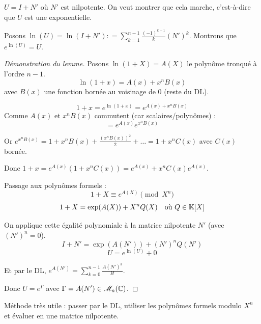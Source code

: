  $U = I + N'$ où $N'$ est nilpotente.
On veut montrer que cela marche, c'est-à-dire que $U$ est une exponentielle.

Posons $\ln(U) = \ln(I + N') \mathrel{\mathop:}= \sum_{k=1}^{n-1} \frac{(-1)^{k-1}}{k} (N')^k$.
Montrons que $e^{\ln(U)} = U$.

\begin{proof}[Démonstration du lemme]
    Posons $\ln(1+X) = A(X)$ le polynôme tronqué à l'ordre $n-1$.
    \[ \ln(1+x) = A(x) + x^n B(x) \]
    avec $B(x)$ une fonction bornée au voisinage de 0 (reste du DL).
    
    \[ 1+x = e^{\ln(1+x)} = e^{A(x) + x^n B(x)} \]
    Comme $A(x)$ et $x^n B(x)$ commutent (car scalaires/polynômes) :
    \[ = e^{A(x)} e^{x^n B(x)} \]
    
    Or $e^{x^n B(x)} = 1 + x^n B(x) + \frac{(x^n B(x))^2}{2} + \dots = 1 + x^n C(x)$ avec $C(x)$ bornée.
    
    Donc $1+x = e^{A(x)} (1 + x^n C(x)) = e^{A(x)} + x^n C(x) e^{A(x)}$.
    
    Passage aux polynômes formels :
    \[ 1+X \equiv e^{A(X)} \pmod{X^n} \]
    \[ 1+X = \exp(A(X)) + X^n Q(X) \quad \text{où } Q \in \mathbb{K}[X] \]
    
    On applique cette égalité polynomiale à la matrice nilpotente $N'$ (avec $(N')^n = 0$).
    \[ I + N' = \exp(A(N')) + (N')^n Q(N') \]
    \[ U = e^{\ln(U)} + 0 \]
    
    Et par le DL, $e^{A(N')} = \sum_{k=0}^{n-1} \frac{A(N')^k}{k!}$.
    
    Donc $U = e^{\Gamma}$ avec $\Gamma = A(N') \in \mathscr M_n(\mathbb{C})$.
\end{proof}

\begin{center}
\end{center}

\begin{remarque}
    Méthode très utile : passer par le DL, utiliser les polynômes formels modulo $X^n$ et évaluer en une matrice nilpotente.
\end{remarque}